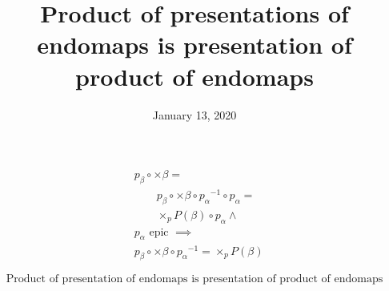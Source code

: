 \documentclass[fleqn, 11pt]{article}
\date{January 13, 2020}
\title{Product of presentations of endomaps is presentation of product of endomaps}
\begin{document}

\begin{equation*}
\begin{aligned}
& p_\beta \circ \times \beta = \\
& \qquad p_\beta \circ \times \beta \circ {p_\alpha}^{-1} \circ p_\alpha = \\
& \qquad \times_p P(\beta) \circ p_\alpha \land \\
& p_\alpha \text{ epic } \implies \\
& p_\beta \circ \times \beta \circ {p_\alpha}^{-1} = \times_p P(\beta)
\end{aligned}
\end{equation*}

\hrulefill

$$ \text{ Product of presentation of endomaps is presentation of product of endomaps } $$
\end{document}
